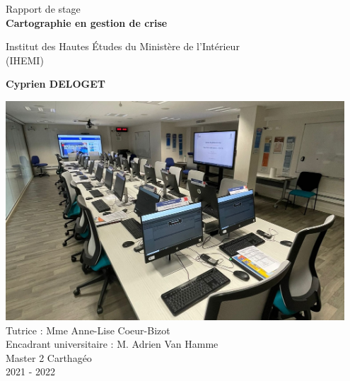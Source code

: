 \begin{titlepage}
    \begin{center}
        \vspace*{0.25cm}
        Rapport de stage\\
        \vspace{0.5cm}
        \textbf{\huge Cartographie en gestion de crise}
 
        \vspace{0.5cm}
        Institut des Hautes Études du Ministère de l'Intérieur \\
        (IHEMI)
        \vspace{0.5cm}
 
        \textbf{Cyprien DELOGET}
        \vspace{1cm}

        \includegraphics[width = 0.95\textwidth]{salledecrise_titlepage.jpg}
        \vfill
        \vspace{1cm}
        Tutrice : Mme Anne-Lise Coeur-Bizot\\
        Encadrant universitaire : M. Adrien Van Hamme\\
        \vspace{0.25cm}    
        Master 2 Carthagéo\\
        2021 - 2022
        
        \vspace{0.6cm}


\end{center}
\end{titlepage}
